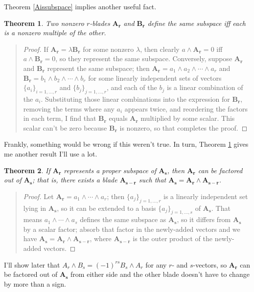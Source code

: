 \documentclass{utarticle}
\newcommand{\bl}[1]{\ensuremath{\bm{#1}}}
\DeclareMathOperator{\out}{\wedge}
\newtheorem{thm}{Theorem}
\newcommand{\bp}{\begin{quotation} \begin{proof}}
\newcommand{\ep}{\end{proof} \end{quotation}}
\begin{document}
Theorem \ref{Aissubspace} implies another useful fact.
\begin{thm}
Two nonzero $r$-blades \bl{A_r} and \bl{B_r} define the same subspace iff each is a 
nonzero multiple of the other.  
\label{AmultofBifsamespace}
\end{thm}
\bp
If $\bl{A_r} = \lambda \bl{B_r}$ for some nonzero $\lambda$, 
then clearly $a \out \bl{A_r} = 0$ iff $a \out \bl{B_r} = 0$, so they represent 
the same subspace.  Conversely, suppose \bl{A_r} and \bl{B_r} represent the same 
subspace; then $\bl{A_r} = a_1 \out a_2 \out \dotsb \out a_r$ and $\bl{B_r} = 
b_1 \out b_2 \out \dotsb \out b_r$ for some linearly independent 
sets of vectors $\{a_i\}_{i=1,\dotsc,r}$ and $\{b_j\}_{j=1,\dotsc,r}$, and each of the 
$b_j$ is a linear combination of the $a_i$.  Substituting those linear
combinations into the expression for \bl{B_r}, removing the terms where any
$a_i$ appears twice, and reordering the factors in each term, I find that
\bl{B_r} equals \bl{A_r} multiplied by some scalar.  This scalar can't be zero
because \bl{B_r} is nonzero, so that completes the proof.
\ep
Frankly, something would be wrong if this weren't true.  In turn, 
Theorem \ref{AmultofBifsamespace} gives me another result I'll use a lot.
\begin{thm}
If \bl{A_r} represents a proper subspace of \bl{A_s}, then \bl{A_r} can be factored out of 
\bl{A_s}; that is, there exists a blade \bl{A_{s-r}} such that $\bl{A_s} = \bl{A_r} \out \bl{A_{s-r}}$.
\label{factorblade}
\end{thm}
\bp
Let $\bl{A_r} = a_1 \out \dotsb \out a_r$; then $\{a_j\}_{j=1,\dotsc,r}$ is a linearly independent
set lying in \bl{A_s}, so it can be extended to a basis $\{a_j\}_{j=1,\dotsc,s}$ of \bl{A_s}.  That means 
$a_1 \out \dotsb \out a_s$ defines the same subspace as \bl{A_s}, so it differs from \bl{A_s}
by a scalar factor; absorb that factor in the newly-added vectors and we have $\bl{A_s} = 
\bl{A_r} \out \bl{A_{s-r}}$, where \bl{A_{s-r}} is the outer product of the newly-added vectors.
\ep
I'll show later that $A_r \out B_s = (-1)^{rs} B_s \out A_r$ for any $r$- and $s$-vectors, so 
\bl{A_r} can be factored out of \bl{A_s} from either side and the other blade doesn't have to 
change by more than a sign.
 
\end{document}
